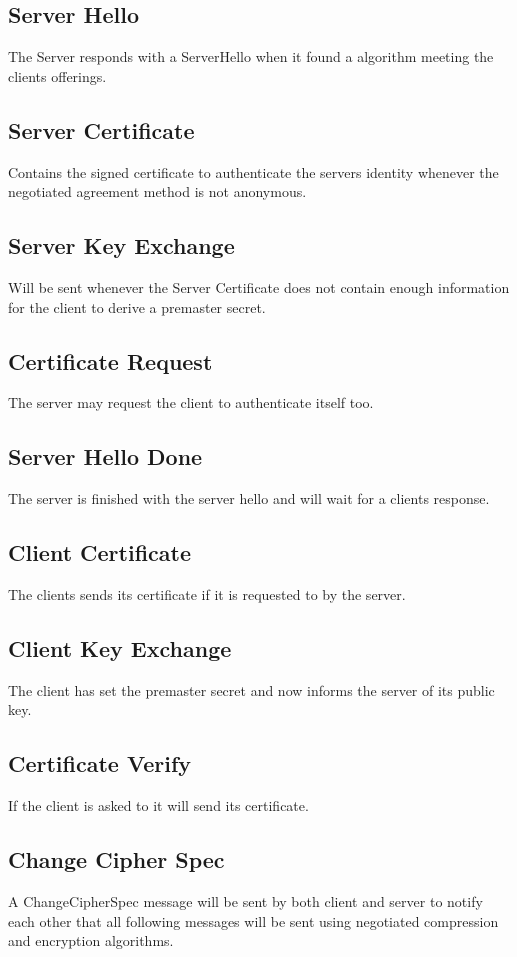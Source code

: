 \documentclass[12pt, letterpaper]{article}
\begin{document}
\subsection*{Server Hello}
The Server responds with a ServerHello when it found a algorithm meeting the clients offerings.


\subsection*{Server Certificate}
Contains the signed certificate to authenticate the servers identity whenever the negotiated agreement method is not anonymous.

\subsection*{Server Key Exchange}
Will be sent whenever the Server Certificate does not contain enough information for the client to derive a premaster secret.

\subsection*{Certificate Request}
The server may request the client to authenticate itself too.

\subsection*{Server Hello Done}
The server is finished with the server hello and will wait for a clients response.

\subsection*{Client Certificate}
The clients sends its certificate if it is requested to by the server. 

\subsection*{Client Key Exchange}
The client has set the premaster secret and now informs the server of its public key.

\subsection*{Certificate Verify}
If the client is asked to it will send its certificate.

\subsection*{Change Cipher Spec}
A ChangeCipherSpec message will be sent by both client and server to notify each other that all following messages will be sent using negotiated compression and encryption algorithms. 
\end{document}
